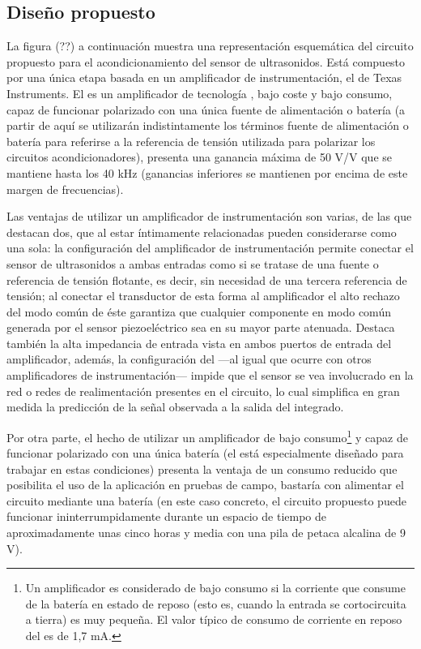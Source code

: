 

\subsection{Diseño propuesto}

La figura (??) a continuación muestra una representación esquemática del
circuito propuesto para el acondicionamiento del sensor de ultrasonidos.
Está compuesto por una única etapa basada en un amplificador de
instrumentación, el  de Texas Instruments. El  es
un amplificador de tecnología , bajo coste y bajo consumo, capaz
de funcionar polarizado con una única fuente de alimentación o batería (a
partir de aquí se utilizarán indistintamente los términos fuente de
alimentación o batería para referirse a la referencia de tensión utilizada
para polarizar los circuitos acondicionadores), presenta una ganancia
máxima de 50 V/V que se mantiene hasta los 40 kHz (ganancias inferiores se
mantienen por encima de este margen de frecuencias).

Las ventajas de utilizar un amplificador de instrumentación son varias, de
las que destacan dos, que al estar íntimamente relacionadas pueden
considerarse como una sola: la configuración del amplificador de
instrumentación permite conectar el sensor de ultrasonidos a ambas entradas
como si se tratase de una fuente o referencia de tensión flotante, es
decir, sin necesidad de una tercera referencia de tensión; al conectar el
transductor de esta forma al amplificador el alto rechazo del modo común de
éste garantiza que cualquier componente en modo común generada por el
sensor piezoeléctrico sea en su mayor parte atenuada. Destaca también la
alta impedancia de entrada vista en ambos puertos de entrada del
amplificador, además, la configuración del  ---al igual que
ocurre con otros amplificadores de instrumentación--- impide que el sensor
se vea involucrado en la red o redes de realimentación presentes en el
circuito, lo cual simplifica en gran medida la predicción de la señal
observada a la salida del integrado.

Por otra parte, el hecho de utilizar un amplificador de bajo
consumo\footnote{Un amplificador es considerado de bajo consumo si la
corriente que consume de la batería en estado de reposo (esto es, cuando la
entrada se cortocircuita a tierra) es muy pequeña. El valor típico de
consumo de corriente en reposo del  es de 1,7 mA.} y capaz de
funcionar polarizado con una única batería (el  está
especialmente diseñado para trabajar en estas condiciones) presenta la
ventaja de un consumo reducido que posibilita el uso de la aplicación en
pruebas de campo, bastaría con alimentar el circuito mediante una batería
(en este caso concreto, el circuito propuesto puede funcionar
ininterrumpidamente durante un espacio de tiempo de aproximadamente unas
cinco horas y media con una pila de petaca alcalina de 9 V).

